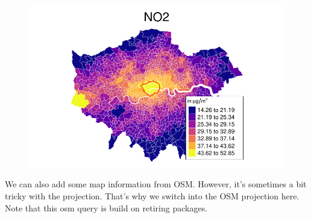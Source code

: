 \documentclass[
  letterpaper,
  DIV=11,
  numbers=noendperiod]{scrreprt}
\begin{document}
\begin{figure}[H]

{\centering \includegraphics{02_spatial-data_files/figure-pdf/unnamed-chunk-18-1.pdf}

}

\end{figure}

We can also add some map information from OSM. However, it's sometimes a
bit tricky with the projection. That's why we switch into the OSM
projection here. Note that this osm query is build on retiring packages.
\end{document}
